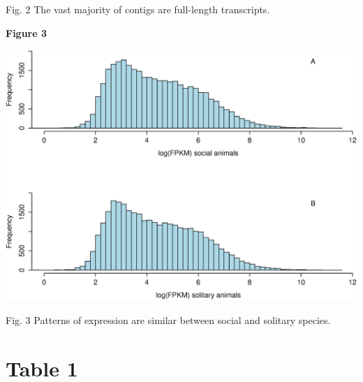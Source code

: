 \documentclass[10.5pt]{article}
\begin{document}
\noindent
Fig. 2 The vast majority of contigs are full-length transcripts. 

\vspace{40mm}
\textbf{\hypertarget{Figure 3}{Figure 3}} \\
\centerline{\includegraphics[width=40.0\baselineskip]{Figure3.eps}}

\noindent
Fig. 3 Patterns of expression are similar between social and solitary species. 


\vspace{80mm}

\section*{Table 1}
\end{document}
